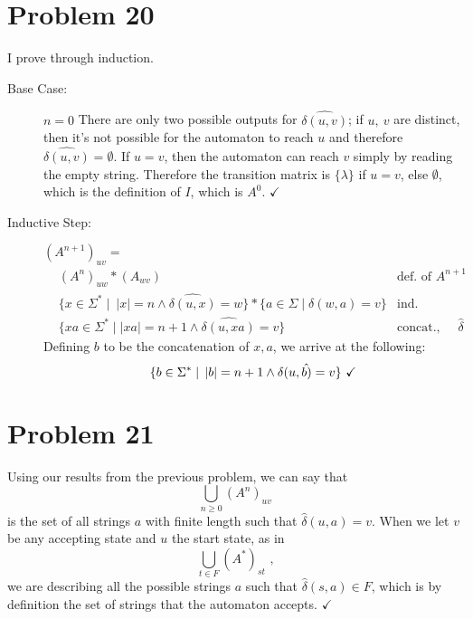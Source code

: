 \documentclass[11pt]{article}
\begin{document}
\section*{Problem 20}
I prove through induction.
\begin{description}
	\item [Base Case:] $n = 0$
	There are only two possible outputs for $\hat{\delta(u, v)}$; if $u,\ v$ are distinct, then it's not possible for the automaton to reach $u$ and therefore $\hat{\delta(u,v)}= \emptyset$. If $u = v$, then the automaton can reach $v$ simply by reading the empty string. Therefore the transition matrix is $\{\lambda \}$ if $u =v$, else $\emptyset$, which is the definition of $I$, which is $A^0$. $\checkmark$
	
	\item [Inductive Step:] $(A^{n+1})_{uv} =$
	\begin{align*}
		&(A^n)_{uw} * (A_{wv}) &\text{def. of $A^{n+1}$} \\
		&\{x \in \Sigma^* \mid\ |x| = n \wedge \hat{\delta(u,x)} = w\} * \{a \in \Sigma \mid \delta(w, a) = v\} &\text{ind. hypothesis}\\
		&\{ xa \in \Sigma^* \mid |xa| = n+1 \wedge \hat{\delta(u, xa)} = v \} &\text {concat., def of $\hat{\delta}$}
	\end{align*}
	Defining $b$ to be the concatenation of $x, a$, we arrive at the following:
	\[\{b \in \Sigma^* \mid\ \abs{b}= n +1 \wedge \hat{\delta(u, b) = v} \}\ \checkmark \]
	

\end{description}




\section*{Problem 21}
Using our results from the previous problem, we can say that
	\[ \bigcup _{n \geq 0} (A^n)_{uv} \]
is the set of all strings $a$ with finite length such that $\hat{\delta}(u, a) = v $. When we let $v$ be any accepting state and $u$ the start state, as in 
	\[ \bigcup _{t \in F} (A^*)_{st} \text{ ,} \]
we are describing all the possible strings $a$ such that $\hat{ \delta }(s, a) \in F$, which is by definition the set of strings that the automaton accepts. $\checkmark$
\end{document}
